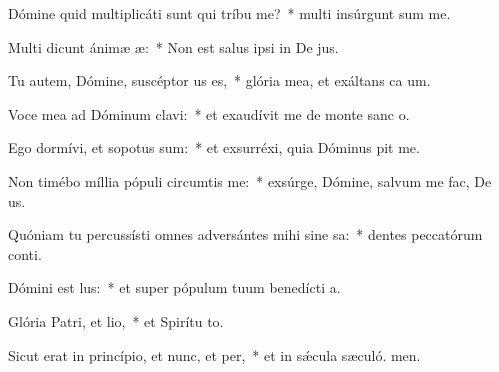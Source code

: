 \item Dómine quid multiplicáti sunt qui tríbu me?~* multi insúrgunt sum me.
\item Multi dicunt ánimæ æ:~* Non est salus ipsi in De jus.
\item Tu autem, Dómine, suscéptor us es,~* glória mea, et exáltans ca um.
\item Voce mea ad Dóminum clavi:~* et exaudívit me de monte sanc o.
\item Ego dormívi, et sopotus sum:~* et exsurréxi, quia Dóminus pit me.
\item Non timébo míllia pópuli circumtis me:~* exsúrge, Dómine, salvum me fac, De us.
\item Quóniam tu percussísti omnes adversántes mihi sine sa:~* dentes peccatórum conti.
\item Dómini est lus:~* et super pópulum tuum benedícti a.
\item Glória Patri, et lio,~* et Spirítu to.
\item Sicut erat in princípio, et nunc, et per,~* et in sǽcula sæculó. men.
